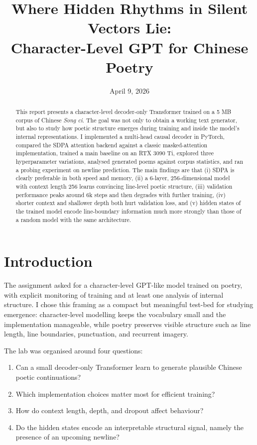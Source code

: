 \documentclass[11pt]{article}
\title{Where Hidden Rhythms in Silent Vectors Lie:\\
Character-Level GPT for Chinese Poetry}
\author{}
\date{April 9, 2026}
\begin{document}
\maketitle

\begin{abstract}
This report presents a character-level decoder-only Transformer trained on a 5 MB corpus of Chinese \emph{Song ci}. The goal was not only to obtain a working text generator, but also to study how poetic structure emerges during training and inside the model's internal representations. I implemented a multi-head causal decoder in PyTorch, compared the SDPA attention backend against a classic masked-attention implementation, trained a main baseline on an RTX 3090 Ti, explored three hyperparameter variations, analysed generated poems against corpus statistics, and ran a probing experiment on newline prediction. The main findings are that (i) SDPA is clearly preferable in both speed and memory, (ii) a 6-layer, 256-dimensional model with context length 256 learns convincing line-level poetic structure, (iii) validation performance peaks around 6k steps and then degrades with further training, (iv) shorter context and shallower depth both hurt validation loss, and (v) hidden states of the trained model encode line-boundary information much more strongly than those of a random model with the same architecture.
\end{abstract}

\section{Introduction}
The assignment asked for a character-level GPT-like model trained on poetry, with explicit monitoring of training and at least one analysis of internal structure. I chose this framing as a compact but meaningful test-bed for studying emergence: character-level modelling keeps the vocabulary small and the implementation manageable, while poetry preserves visible structure such as line length, line boundaries, punctuation, and recurrent imagery.

The lab was organised around four questions:
\begin{enumerate}
    \item Can a small decoder-only Transformer learn to generate plausible Chinese poetic continuations?
    \item Which implementation choices matter most for efficient training?
    \item How do context length, depth, and dropout affect behaviour?
    \item Do the hidden states encode an interpretable structural signal, namely the presence of an upcoming newline?
\end{enumerate}
\end{document}
